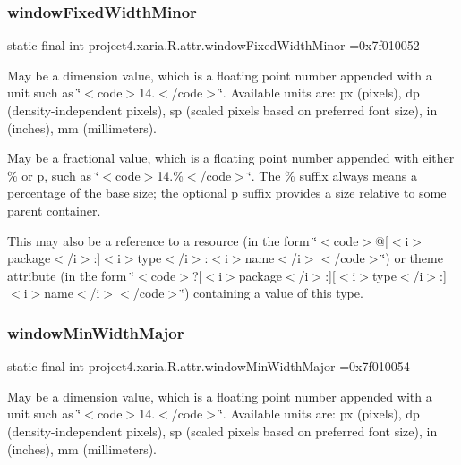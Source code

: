 \subsubsection{\texorpdfstring{window\+Fixed\+Width\+Minor}{windowFixedWidthMinor}}
{\footnotesize\ttfamily static final int project4.\+xaria.\+R.\+attr.\+window\+Fixed\+Width\+Minor =0x7f010052\hspace{0.3cm}{\ttfamily [static]}}

May be a dimension value, which is a floating point number appended with a unit such as \char`\"{}$<$code$>$14.\+5sp$<$/code$>$\char`\"{}. Available units are\+: px (pixels), dp (density-\/independent pixels), sp (scaled pixels based on preferred font size), in (inches), mm (millimeters). 

May be a fractional value, which is a floating point number appended with either \% or p, such as \char`\"{}$<$code$>$14.\%$<$/code$>$\char`\"{}. The \% suffix always means a percentage of the base size; the optional p suffix provides a size relative to some parent container. 

This may also be a reference to a resource (in the form \char`\"{}$<$code$>$@\mbox{[}$<$i$>$package$<$/i$>$\+:\mbox{]}$<$i$>$type$<$/i$>$\+:$<$i$>$name$<$/i$>$$<$/code$>$\char`\"{}) or theme attribute (in the form \char`\"{}$<$code$>$?\mbox{[}$<$i$>$package$<$/i$>$\+:\mbox{]}\mbox{[}$<$i$>$type$<$/i$>$\+:\mbox{]}$<$i$>$name$<$/i$>$$<$/code$>$\char`\"{}) containing a value of this type. \mbox{\label{classproject4_1_1xaria_1_1R_1_1attr_aed5952961d833452c641606816e51df1}} 
\subsubsection{\texorpdfstring{window\+Min\+Width\+Major}{windowMinWidthMajor}}
{\footnotesize\ttfamily static final int project4.\+xaria.\+R.\+attr.\+window\+Min\+Width\+Major =0x7f010054\hspace{0.3cm}{\ttfamily [static]}}

May be a dimension value, which is a floating point number appended with a unit such as \char`\"{}$<$code$>$14.\+5sp$<$/code$>$\char`\"{}. Available units are\+: px (pixels), dp (density-\/independent pixels), sp (scaled pixels based on preferred font size), in (inches), mm (millimeters). 

